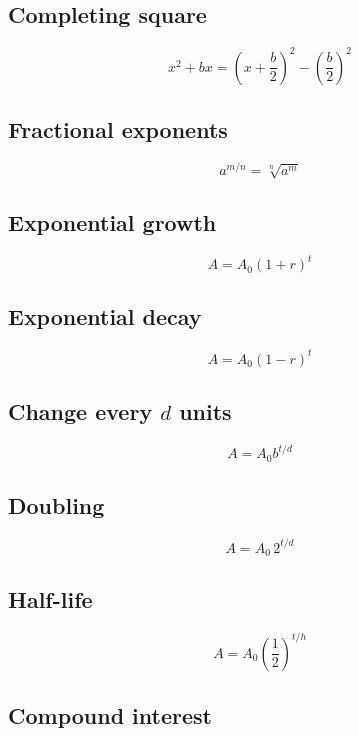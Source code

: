 \documentclass[
]{article}
\begin{document}
\subsection{Completing square}\label{completing-square}

\[
\boxed{x^2+bx=
\left(x+\frac b2\right)^2-
\left(\frac b2\right)^2}
\]

\subsection{Fractional exponents}\label{fractional-exponents}

\[
\boxed{a^{m/n}=\sqrt[n]{a^m}}
\]

\subsection{Exponential growth}\label{exponential-growth}

\[
\boxed{A=A_0(1+r)^t}
\]

\subsection{Exponential decay}\label{exponential-decay}

\[
\boxed{A=A_0(1-r)^t}
\]

\subsection{\texorpdfstring{Change every \(d\)
units}{Change every d units}}\label{change-every-d-units}

\[
\boxed{A=A_0b^{t/d}}
\]

\subsection{Doubling}\label{doubling}

\[
\boxed{A=A_0\,2^{t/d}}
\]

\subsection{Half-life}\label{half-life-1}

\[
\boxed{A=A_0\left(\frac12\right)^{t/h}}
\]

\subsection{Compound interest}\label{compound-interest}
\end{document}
